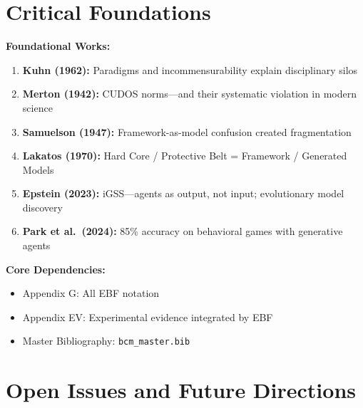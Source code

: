 \section{Critical Foundations}
\label{sec:meta-foundations}

\begin{tcolorbox}[colback=yellow!5!white, colframe=yellow!75!black,
    title=\textbf{Critical Foundations for LIT-META}]

\textbf{Foundational Works:}
\begin{enumerate}[nosep]
    \item \textbf{Kuhn (1962):} Paradigms and incommensurability explain disciplinary silos
    \item \textbf{Merton (1942):} CUDOS norms—and their systematic violation in modern science
    \item \textbf{Samuelson (1947):} Framework-as-model confusion created fragmentation
    \item \textbf{Lakatos (1970):} Hard Core / Protective Belt = Framework / Generated Models
    \item \textbf{Epstein (2023):} iGSS---agents as output, not input; evolutionary model discovery
    \item \textbf{Park et al.\ (2024):} 85\% accuracy on behavioral games with generative agents
\end{enumerate}

\textbf{Core Dependencies:}
\begin{itemize}[nosep]
    \item Appendix G: All EBF notation
    \item Appendix EV: Experimental evidence integrated by EBF
    \item Master Bibliography: \texttt{bcm\_master.bib}
\end{itemize}

\end{tcolorbox}


\section{Open Issues and Future Directions}
\label{sec:meta-open-issues}

